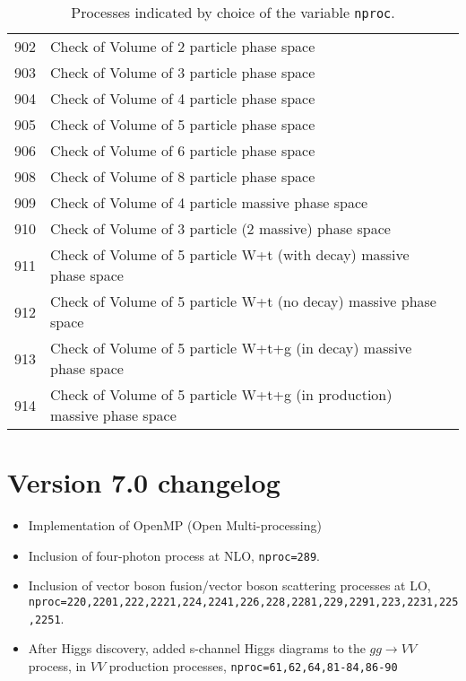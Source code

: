 \documentclass[12pt]{article}
\begin{document}
\begin{table}
\begin{center}
\begin{tabular}{|l|l|l|}
\hline
902 & Check of Volume of 2 particle phase space & \\  
903 & Check of Volume of 3 particle phase space & \\  
904 & Check of Volume of 4 particle phase space & \\  
905 & Check of Volume of 5 particle phase space & \\  
906 & Check of Volume of 6 particle phase space & \\  
908 & Check of Volume of 8 particle phase space & \\  
909 & Check of Volume of 4 particle massive phase space & \\  
910 & Check of Volume of 3 particle (2 massive) phase space & \\  
911 & Check of Volume of 5 particle W+t (with decay) massive phase space & \\  
912 & Check of Volume of 5 particle W+t (no decay) massive phase space & \\  
913 & Check of Volume of 5 particle W+t+g (in decay) massive phase space & \\  
914 & Check of Volume of 5 particle W+t+g (in production) massive phase space & \\  
\hline 
\hline
\end{tabular}
\caption{Processes indicated by choice of the variable {\tt nproc}.\label{nproctable}}
\end{center}
\end{table}
\clearpage

\section{Version 7.0 changelog}
\label{changelog7.0}
\begin{itemize}
\item Implementation of OpenMP (Open Multi-processing)
\item Inclusion of four-photon process at NLO, {\tt nproc=289}.
\item Inclusion of vector boson fusion/vector boson scattering processes at LO,
 {\tt nproc=220,2201,222,2221,224,2241,226,228,2281,229,2291,223,2231,225,2251}.
\item After Higgs discovery, added s-channel Higgs diagrams to the $gg \to VV$ process,
in $VV$ production processes, {\tt nproc=61,62,64,81-84,86-90}
\end{itemize}
\end{document}
